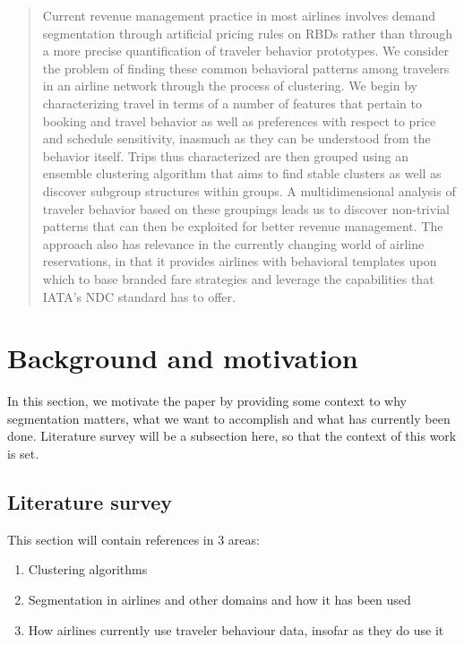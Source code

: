 \begin{abstract}
Current revenue management practice in most airlines involves demand segmentation through artificial pricing rules on RBDs rather than through a more precise quantification of traveler behavior prototypes. We consider the problem of finding these common behavioral patterns among travelers in an airline network through the process of clustering. We begin by characterizing travel in terms of a number of features that pertain to booking and travel behavior as well as preferences with respect to price and schedule sensitivity, inasmuch as they can be understood from the behavior itself. Trips thus characterized are then grouped using an ensemble clustering algorithm that aims to find stable clusters as well as discover subgroup structures within groups. A multidimensional analysis of traveler behavior based on these groupings leads us to discover non-trivial patterns that can then be exploited for better revenue management. The approach also has relevance in the currently changing world of airline reservations, in that it provides airlines with behavioral templates upon which to base branded fare strategies and leverage the capabilities that IATA’s NDC standard has to offer.
\end{abstract}

\section{Background and motivation}
\label{sec:intro}

In this section, we motivate the paper by providing some context to why segmentation matters, what we want to accomplish and what has currently been done. Literature survey will be a subsection here, so that the context of this work is set.

\subsection{Literature survey}
\label{sec:lit}

This section will contain references in 3 areas: 

\begin{enumerate}
\item Clustering algorithms
\item Segmentation in airlines and other domains and how it has been used
\item How airlines currently use traveler behaviour data, insofar as they do use it
\end{enumerate}

